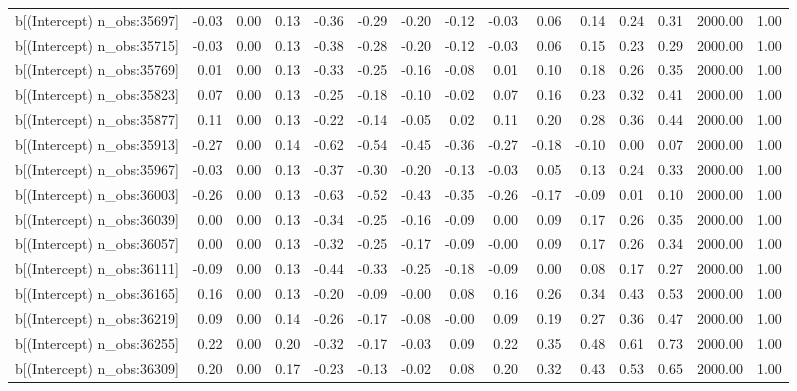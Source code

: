 \begin{table}[ht]
\begin{tabular}{rrrrrrrrrrrrrrr}
  b[(Intercept) n\_obs:35697] & -0.03 & 0.00 & 0.13 & -0.36 & -0.29 & -0.20 & -0.12 & -0.03 & 0.06 & 0.14 & 0.24 & 0.31 & 2000.00 & 1.00 \\ 
  b[(Intercept) n\_obs:35715] & -0.03 & 0.00 & 0.13 & -0.38 & -0.28 & -0.20 & -0.12 & -0.03 & 0.06 & 0.15 & 0.23 & 0.29 & 2000.00 & 1.00 \\ 
  b[(Intercept) n\_obs:35769] & 0.01 & 0.00 & 0.13 & -0.33 & -0.25 & -0.16 & -0.08 & 0.01 & 0.10 & 0.18 & 0.26 & 0.35 & 2000.00 & 1.00 \\ 
  b[(Intercept) n\_obs:35823] & 0.07 & 0.00 & 0.13 & -0.25 & -0.18 & -0.10 & -0.02 & 0.07 & 0.16 & 0.23 & 0.32 & 0.41 & 2000.00 & 1.00 \\ 
  b[(Intercept) n\_obs:35877] & 0.11 & 0.00 & 0.13 & -0.22 & -0.14 & -0.05 & 0.02 & 0.11 & 0.20 & 0.28 & 0.36 & 0.44 & 2000.00 & 1.00 \\ 
  b[(Intercept) n\_obs:35913] & -0.27 & 0.00 & 0.14 & -0.62 & -0.54 & -0.45 & -0.36 & -0.27 & -0.18 & -0.10 & 0.00 & 0.07 & 2000.00 & 1.00 \\ 
  b[(Intercept) n\_obs:35967] & -0.03 & 0.00 & 0.13 & -0.37 & -0.30 & -0.20 & -0.13 & -0.03 & 0.05 & 0.13 & 0.24 & 0.33 & 2000.00 & 1.00 \\ 
  b[(Intercept) n\_obs:36003] & -0.26 & 0.00 & 0.13 & -0.63 & -0.52 & -0.43 & -0.35 & -0.26 & -0.17 & -0.09 & 0.01 & 0.10 & 2000.00 & 1.00 \\ 
  b[(Intercept) n\_obs:36039] & 0.00 & 0.00 & 0.13 & -0.34 & -0.25 & -0.16 & -0.09 & 0.00 & 0.09 & 0.17 & 0.26 & 0.35 & 2000.00 & 1.00 \\ 
  b[(Intercept) n\_obs:36057] & 0.00 & 0.00 & 0.13 & -0.32 & -0.25 & -0.17 & -0.09 & -0.00 & 0.09 & 0.17 & 0.26 & 0.34 & 2000.00 & 1.00 \\ 
  b[(Intercept) n\_obs:36111] & -0.09 & 0.00 & 0.13 & -0.44 & -0.33 & -0.25 & -0.18 & -0.09 & 0.00 & 0.08 & 0.17 & 0.27 & 2000.00 & 1.00 \\ 
  b[(Intercept) n\_obs:36165] & 0.16 & 0.00 & 0.13 & -0.20 & -0.09 & -0.00 & 0.08 & 0.16 & 0.26 & 0.34 & 0.43 & 0.53 & 2000.00 & 1.00 \\ 
  b[(Intercept) n\_obs:36219] & 0.09 & 0.00 & 0.14 & -0.26 & -0.17 & -0.08 & -0.00 & 0.09 & 0.19 & 0.27 & 0.36 & 0.47 & 2000.00 & 1.00 \\ 
  b[(Intercept) n\_obs:36255] & 0.22 & 0.00 & 0.20 & -0.32 & -0.17 & -0.03 & 0.09 & 0.22 & 0.35 & 0.48 & 0.61 & 0.73 & 2000.00 & 1.00 \\ 
  b[(Intercept) n\_obs:36309] & 0.20 & 0.00 & 0.17 & -0.23 & -0.13 & -0.02 & 0.08 & 0.20 & 0.32 & 0.43 & 0.53 & 0.65 & 2000.00 & 1.00 \\ 

\end{tabular}
\end{table}
